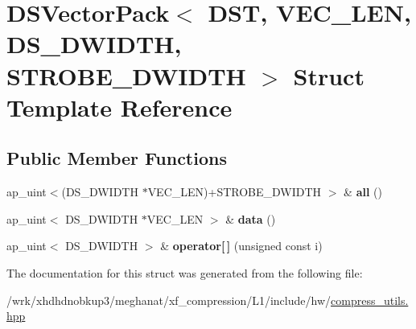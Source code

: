 \hypertarget{structDSVectorPack}{\section{D\-S\-Vector\-Pack$<$ D\-S\-T, V\-E\-C\-\_\-\-L\-E\-N, D\-S\-\_\-\-D\-W\-I\-D\-T\-H, S\-T\-R\-O\-B\-E\-\_\-\-D\-W\-I\-D\-T\-H $>$ Struct Template Reference}
\label{structDSVectorPack}
}
\subsection*{Public Member Functions}
\begin{DoxyCompactItemize}
\item 
\hypertarget{structDSVectorPack_ae7581fa6653b77c197fabf35a38e4ecb}{ap\-\_\-uint$<$(D\-S\-\_\-\-D\-W\-I\-D\-T\-H $\ast$V\-E\-C\-\_\-\-L\-E\-N)+S\-T\-R\-O\-B\-E\-\_\-\-D\-W\-I\-D\-T\-H $>$ \& {\bfseries all} ()}\label{structDSVectorPack_ae7581fa6653b77c197fabf35a38e4ecb}

\item 
\hypertarget{structDSVectorPack_aa623ef3038393ef7519ee1de15ebeaca}{ap\-\_\-uint$<$ D\-S\-\_\-\-D\-W\-I\-D\-T\-H $\ast$V\-E\-C\-\_\-\-L\-E\-N $>$ \& {\bfseries data} ()}\label{structDSVectorPack_aa623ef3038393ef7519ee1de15ebeaca}

\item 
\hypertarget{structDSVectorPack_ac33d85940e3ae535d8ecccf9939019e8}{ap\-\_\-uint$<$ D\-S\-\_\-\-D\-W\-I\-D\-T\-H $>$ \& {\bfseries operator\mbox{[}$\,$\mbox{]}} (unsigned const i)}\label{structDSVectorPack_ac33d85940e3ae535d8ecccf9939019e8}

\end{DoxyCompactItemize}


The documentation for this struct was generated from the following file\-:\begin{DoxyCompactItemize}
\item 
/wrk/xhdhdnobkup3/meghanat/xf\-\_\-compression/\-L1/include/hw/\hyperlink{compress__utils_8hpp}{compress\-\_\-utils.\-hpp}\end{DoxyCompactItemize}
